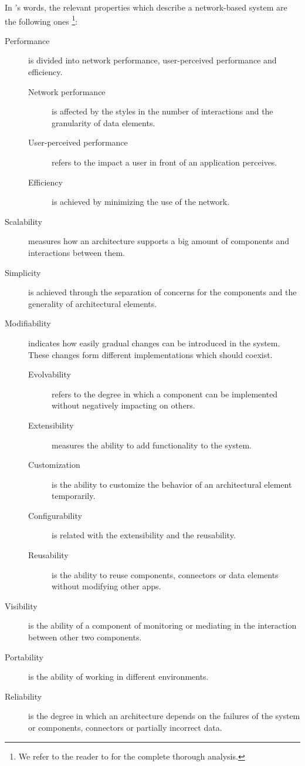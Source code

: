 In \citeauthor{fielding_architectural_2000}'s words, the relevant properties which describe a network-based system are the following ones \footnote{We refer to the reader to \citet{fielding_architectural_2000} for the complete thorough analysis.}:
\begin{description}
  \item[Performance] is divided into network performance, user-perceived performance and efficiency.
    \begin{description}
      \item[Network performance] is affected by the styles in the number of interactions and the granularity of data elements.
      \item[User-perceived performance] refers to the impact a user in front of an application perceives. %
      \item[Efficiency] is achieved by minimizing the use of the network.
    \end{description}
  \item[Scalability] measures how an architecture supports a big amount of components and interactions between them.
  \item[Simplicity] is achieved through the separation of concerns for the components and the generality of architectural elements.
  \item[Modifiability] indicates how easily gradual changes can be introduced in the system.
                       These changes form different implementations which should coexist.
    \begin{description}
      \item[Evolvability] refers to the degree in which a component can be implemented without negatively impacting on others.
      \item[Extensibility] measures the ability to add functionality to the system.
      \item[Customization] is the ability to customize the behavior of an architectural element temporarily.
      \item[Configurability] is related with the extensibility and the reusability.
      \item[Reusability] is the ability to reuse components, connectors or data elements without modifying other apps.
    \end{description}
  \item[Visibility] is the ability of a component of monitoring or mediating in the interaction between other two components.
  \item[Portability] is the ability of working in different environments.
  \item[Reliability] is the degree in which an architecture depends on the failures of the system or components, connectors or partially incorrect data.
\end{description}

